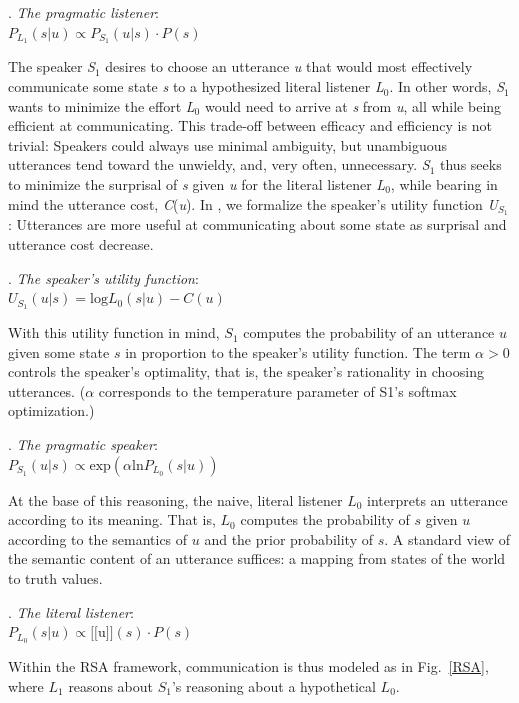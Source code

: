 \documentclass[linguex]{sp}
\newcommand{\sem}[1]{\mbox{$[\![$#1$]\!]$}}
\begin{document}
\ex. \emph{The pragmatic listener}:\\
$P_{L_{1}}(s|u) \propto P_{S_{1}}(u|s) \cdot P(s)$

The speaker \emph{S}$_{1}$ desires to choose an utterance \emph{u} that would most effectively communicate some state \emph{s} to a hypothesized literal listener \emph{L}$_{0}$.  In other words, \emph{S}$_{1}$ wants to minimize the effort \emph{L}$_{0}$ would need to arrive at \emph{s} from \emph{u}, all while being efficient at communicating. This trade-off between efficacy and efficiency is not trivial: Speakers could always use minimal ambiguity, but unambiguous utterances tend toward the unwieldy, and, very often, unnecessary. \emph{S}$_{1}$ thus seeks to minimize the surprisal of \emph{s} given \emph{u} for the literal listener \emph{L}$_{0}$, while bearing in mind the utterance cost, \emph{C}(\emph{u}). In \Next, we formalize the speaker's utility function \emph{U}$_{S_{1}}$: Utterances are more useful at communicating about some state as surprisal and utterance cost decrease.

\ex. \emph{The speaker's utility function}:\\
$U_{S_{1}}(u|s) = \textrm{log}L_{0}(s|u) - C(u)$

With this utility function in mind, $S_{1}$ computes the probability of an utterance $u$ given some state $s$ in proportion to the speaker's utility function. The term \mbox{$\alpha > 0$} controls the speaker's optimality, that is, the speaker's rationality in choosing utterances. ($\alpha$ corresponds to the temperature parameter of S1's softmax optimization.)

\ex. \emph{The pragmatic speaker}:\\
$P_{S_{1}}(u|s) \propto \textrm{exp}(\alpha\textrm{ln}P_{L_{0}}(s|u))$

At the base of this reasoning, the naive, literal listener $L_{0}$ interprets an utterance according to its meaning. That is, $L_{0}$ computes the probability of $s$ given $u$ according to the semantics of $u$ and the prior probability of $s$. A standard view of the semantic content of an utterance suffices: a mapping from states of the world to truth values.

\ex. \emph{The literal listener}:\\
$P_{L_{0}}(s|u) \propto \sem{u}(s) \cdot P(s)$

Within the RSA framework, communication is thus modeled as in Fig.~\ref{RSA}, where $L_{1}$ reasons about $S_{1}$'s reasoning about a hypothetical $L_{0}$.
\end{document}
